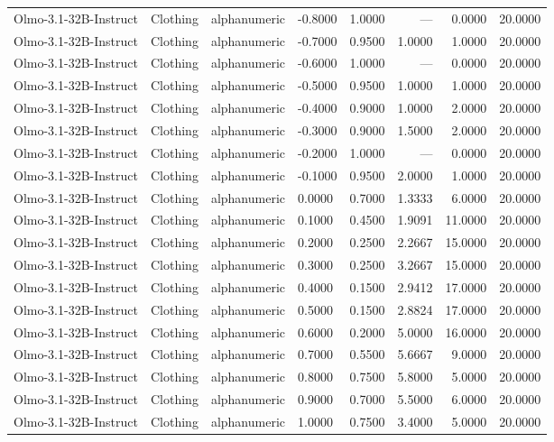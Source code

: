 \begin{table}
\begin{tabular}{llllrrrr}
Olmo-3.1-32B-Instruct & Clothing & alphanumeric & -0.8000 & 1.0000 & --- & 0.0000 & 20.0000 \\
Olmo-3.1-32B-Instruct & Clothing & alphanumeric & -0.7000 & 0.9500 & 1.0000 & 1.0000 & 20.0000 \\
Olmo-3.1-32B-Instruct & Clothing & alphanumeric & -0.6000 & 1.0000 & --- & 0.0000 & 20.0000 \\
Olmo-3.1-32B-Instruct & Clothing & alphanumeric & -0.5000 & 0.9500 & 1.0000 & 1.0000 & 20.0000 \\
Olmo-3.1-32B-Instruct & Clothing & alphanumeric & -0.4000 & 0.9000 & 1.0000 & 2.0000 & 20.0000 \\
Olmo-3.1-32B-Instruct & Clothing & alphanumeric & -0.3000 & 0.9000 & 1.5000 & 2.0000 & 20.0000 \\
Olmo-3.1-32B-Instruct & Clothing & alphanumeric & -0.2000 & 1.0000 & --- & 0.0000 & 20.0000 \\
Olmo-3.1-32B-Instruct & Clothing & alphanumeric & -0.1000 & 0.9500 & 2.0000 & 1.0000 & 20.0000 \\
Olmo-3.1-32B-Instruct & Clothing & alphanumeric & 0.0000 & 0.7000 & 1.3333 & 6.0000 & 20.0000 \\
Olmo-3.1-32B-Instruct & Clothing & alphanumeric & 0.1000 & 0.4500 & 1.9091 & 11.0000 & 20.0000 \\
Olmo-3.1-32B-Instruct & Clothing & alphanumeric & 0.2000 & 0.2500 & 2.2667 & 15.0000 & 20.0000 \\
Olmo-3.1-32B-Instruct & Clothing & alphanumeric & 0.3000 & 0.2500 & 3.2667 & 15.0000 & 20.0000 \\
Olmo-3.1-32B-Instruct & Clothing & alphanumeric & 0.4000 & 0.1500 & 2.9412 & 17.0000 & 20.0000 \\
Olmo-3.1-32B-Instruct & Clothing & alphanumeric & 0.5000 & 0.1500 & 2.8824 & 17.0000 & 20.0000 \\
Olmo-3.1-32B-Instruct & Clothing & alphanumeric & 0.6000 & 0.2000 & 5.0000 & 16.0000 & 20.0000 \\
Olmo-3.1-32B-Instruct & Clothing & alphanumeric & 0.7000 & 0.5500 & 5.6667 & 9.0000 & 20.0000 \\
Olmo-3.1-32B-Instruct & Clothing & alphanumeric & 0.8000 & 0.7500 & 5.8000 & 5.0000 & 20.0000 \\
Olmo-3.1-32B-Instruct & Clothing & alphanumeric & 0.9000 & 0.7000 & 5.5000 & 6.0000 & 20.0000 \\
Olmo-3.1-32B-Instruct & Clothing & alphanumeric & 1.0000 & 0.7500 & 3.4000 & 5.0000 & 20.0000 \\

\end{tabular}
\end{table}

